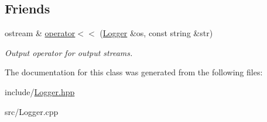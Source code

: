 \subsection*{Friends}
\begin{DoxyCompactItemize}
\item 
\hypertarget{classLogger_a3c2601767789f714554bde47a3a0e808}{ostream \& \hyperlink{classLogger_a3c2601767789f714554bde47a3a0e808}{operator$<$$<$} (\hyperlink{classLogger}{Logger} \&os, const string \&str)}\label{classLogger_a3c2601767789f714554bde47a3a0e808}

\begin{DoxyCompactList}\small\item\em Output operator for output streams. \end{DoxyCompactList}\end{DoxyCompactItemize}


The documentation for this class was generated from the following files\-:\begin{DoxyCompactItemize}
\item 
include/\hyperlink{Logger_8hpp}{Logger.\-hpp}\item 
src/Logger.\-cpp\end{DoxyCompactItemize}
